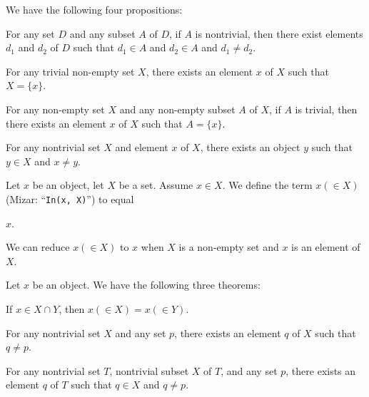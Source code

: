 \documentclass{article}
\begin{document}
We have the following four propositions:
\begin{thm}
\item\label{subset1:45} For any set $D$ and any subset $A$ of $D$, if
  $A$ is nontrivial, then there exist elements $d_{1}$ and $d_{2}$ of
  $D$ such that $d_{1}\in A$ and $d_{2}\in A$ and $d_{1}\neq d_{2}$.
\item\label{subset1:46} For any trivial non-empty set $X$, there exists
  an element $x$ of $X$ such that $X=\{x\}$.
\item\label{subset1:47} For any non-empty set $X$ and any non-empty
  subset $A$ of $X$, if $A$ is trivial, then there exists an element $x$
  of $X$ such that $A=\{x\}$.
\item\label{subset1:48} For any nontrivial set $X$ and element $x$ of $X$,
  there exists an object $y$ such that $y\in X$ and $x\neq y$.
\end{thm}

\begin{definition}
Let $x$ be an object, let $X$ be a set. Assume $x\in X$. We define the
term $x(\in X)$ (Mizar: ``\verb#In(x, X)#'') to equal
\begin{defn}
\item $x$.
\end{defn}
We can reduce $x(\in X)$ to $x$ when $X$ is a non-empty set and $x$ is
an element of $X$.
\end{definition}

Let $x$ be an object. We have the following three theorems:
\begin{thm}
\item\label{subset1:49} If $x\in X\cap Y$, then $x(\in X)=x(\in Y)$.
\item\label{subset1:50} For any nontrivial set $X$ and any set $p$,
  there exists an element $q$ of $X$ such that $q\neq p$.
\item\label{subset1:51} For any nontrivial set $T$, nontrivial subset
  $X$ of $T$, and any set $p$, there exists an element $q$ of $T$ such
  that $q\in X$ and $q\neq p$. 
\end{thm}
\end{document}
